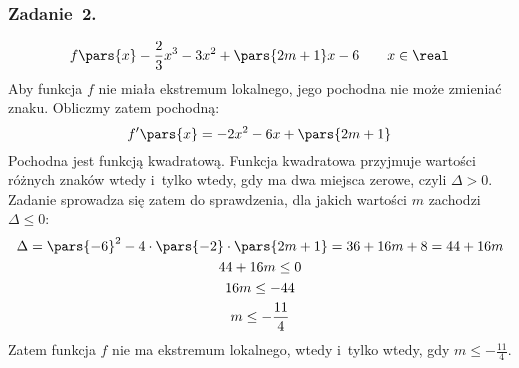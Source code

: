 \subsubsection*{Zadanie~2.}
\begin{equation*}
    f\pars{x}
        -\frac{2}{3}x^3 - 3x^2 + \pars{2m + 1}x - 6 \qquad x \in \real
\end{equation*}
Aby funkcja \(f\) nie miała ekstremum lokalnego, jego pochodna nie może zmieniać znaku. Obliczmy zatem pochodną:
\begin{equation*}
    f'\pars{x} =
        -2x^2 - 6x + \pars{2m + 1}
\end{equation*}
Pochodna jest funkcją kwadratową. Funkcja kwadratowa przyjmuje wartości różnych znaków wtedy i~tylko wtedy, gdy ma dwa miejsca zerowe, czyli \(\Delta > 0\). Zadanie sprowadza się zatem do sprawdzenia, dla jakich wartości \(m\) zachodzi \(\Delta \leq 0\):
\begin{gather*}
    \Delta
        = \pars{-6}^2 - 4 \cdot \pars{-2} \cdot \pars{2m + 1}
        = 36 + 16m + 8
        = 44 + 16m\\
    44 + 16m \leq 0\\
    16m \leq -44\\
    m \leq -\frac{11}{4}
\end{gather*}
Zatem funkcja \(f\) nie ma ekstremum lokalnego, wtedy i~tylko wtedy, gdy \(m \leq -\frac{11}{4}\).
